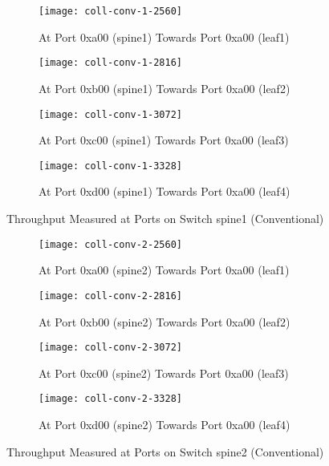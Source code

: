 \begin{figure}
    \centering
    \begin{subfigure}{.45\linewidth}
        \texttt{[image: coll-conv-1-2560]}
        \caption{At Port 0xa00 (spine1) \newline Towards Port 0xa00 (leaf1)}%
        \label{fig:spine1-leaf1-conv}
    \end{subfigure}
    \begin{subfigure}{.45\linewidth}
        \texttt{[image: coll-conv-1-2816]}
        \caption{At Port 0xb00 (spine1) \newline Towards Port 0xa00 (leaf2)}%
        \label{fig:spine1-leaf2-conv}
    \end{subfigure}
    \begin{subfigure}{.45\linewidth}
        \texttt{[image: coll-conv-1-3072]}
        \caption{At Port 0xc00 (spine1) \newline Towards Port 0xa00 (leaf3)}%
        \label{fig:spine1-leaf3-conv}
    \end{subfigure}
    \begin{subfigure}{.45\linewidth}
        \texttt{[image: coll-conv-1-3328]}
        \caption{At Port 0xd00 (spine1) \newline Towards Port 0xa00 (leaf4)}%
        \label{fig:spine1-leaf4-conv}
    \end{subfigure}
    \caption{Throughput Measured at Ports on Switch spine1 (Conventional)}%
    \label{fig:coll-spine1-conv}
\end{figure}

\begin{figure}
    \begin{subfigure}{.45\linewidth}
        \texttt{[image: coll-conv-2-2560]}
        \caption{At Port 0xa00 (spine2) \newline Towards Port 0xa00 (leaf1)}%
        \label{fig:spine2-leaf1-conv}
    \end{subfigure}
    \begin{subfigure}{.45\linewidth}
        \texttt{[image: coll-conv-2-2816]}
        \caption{At Port 0xb00 (spine2) \newline Towards Port 0xa00 (leaf2)}%
        \label{fig:spine2-leaf2-conv}
    \end{subfigure}
    \begin{subfigure}{.45\linewidth}
        \texttt{[image: coll-conv-2-3072]}
        \caption{At Port 0xc00 (spine2) \newline Towards Port 0xa00 (leaf3)}%
        \label{fig:spine2-leaf3-conv}
    \end{subfigure}
    \begin{subfigure}{.45\linewidth}
        \texttt{[image: coll-conv-2-3328]}
        \caption{At Port 0xd00 (spine2) \newline Towards Port 0xa00 (leaf4)}%
        \label{fig:spine2-leaf4-conv}
    \end{subfigure}
    \caption{Throughput Measured at Ports on Switch spine2 (Conventional)}%
    \label{fig:coll-spine2-conv}
\end{figure}


